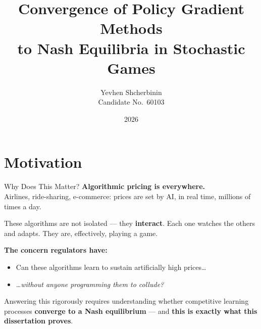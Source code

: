 \documentclass[aspectratio=169,11pt]{beamer}
\title{Convergence of Policy Gradient Methods\\
  to Nash Equilibria in Stochastic Games}
\author{Yevhen Shcherbinin\\[4pt]
  {\small Candidate No.\ 60103}}
\institute{Department of Mathematics\\
  London School of Economics}
\date{2026}
\begin{document}
\begin{frame}
  \titlepage
\end{frame}

\section{Motivation}

\begin{frame}{Why Does This Matter?}
  \textbf{Algorithmic pricing is everywhere.}\\[4pt]
  Airlines, ride-sharing, e-commerce: prices are set by AI, in real time,
  millions of times a day.

  \bigskip

  These algorithms are not isolated --- they \textbf{interact}.
  Each one watches the others and adapts. They are, effectively, playing a game.

  \bigskip

  \textbf{The concern regulators have:}
  \begin{itemize}
    \item Can these algorithms learn to sustain artificially high prices\ldots
    \item \ldots\emph{without anyone programming them to collude?}
  \end{itemize}

  \bigskip

  Answering this rigorously requires understanding whether competitive
  learning processes \textbf{converge to a Nash equilibrium} ---
  and \textbf{this is exactly what this dissertation proves}.
\end{frame}
\end{document}
